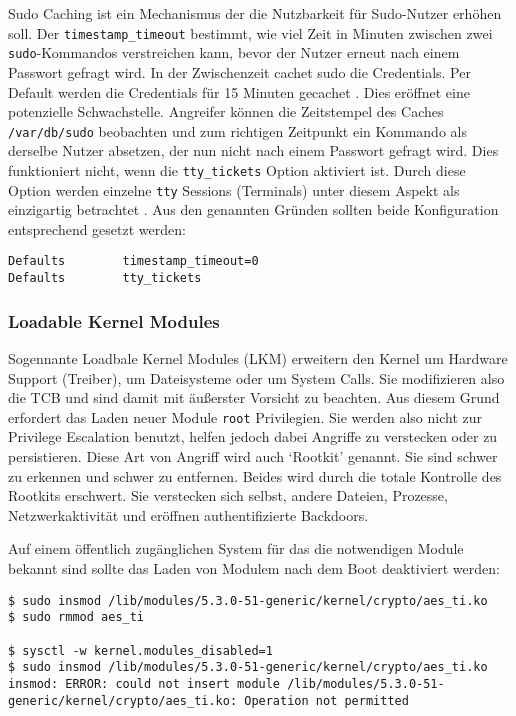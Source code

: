 Sudo Caching ist ein Mechanismus der die Nutzbarkeit für Sudo-Nutzer erhöhen soll. Der \texttt{timestamp\_timeout} bestimmt, wie viel Zeit in Minuten zwischen zwei \texttt{sudo}-Kommandos verstreichen kann, bevor der Nutzer erneut nach einem Passwort gefragt wird. In der Zwischenzeit cachet sudo die Credentials. Per Default werden die Credentials für 15 Minuten gecachet \cite{man-sudo}.
Dies eröffnet eine potenzielle Schwachstelle. Angreifer können die Zeitstempel des Caches \texttt{/var/db/sudo} beobachten und zum richtigen Zeitpunkt ein Kommando als derselbe Nutzer absetzen, der nun nicht nach einem Passwort gefragt wird. Dies funktioniert nicht, wenn die \texttt{tty\_tickets} Option aktiviert ist. Durch diese Option werden einzelne \texttt{tty} Sessions (Terminals) unter diesem Aspekt als einzigartig betrachtet \cite{attack-sudo-caching}.
Aus den genannten Gründen sollten beide Konfiguration entsprechend gesetzt werden:

\begin{lstlisting}
Defaults        timestamp_timeout=0
Defaults        tty_tickets 
\end{lstlisting}


\subsubsection{Loadable Kernel Modules}

Sogennante Loadbale Kernel Modules (LKM) erweitern den Kernel um Hardware Support (Treiber), um Dateisysteme oder um System Calls. Sie modifizieren also die TCB und sind damit mit äußerster Vorsicht zu beachten. Aus diesem Grund erfordert das Laden neuer Module \texttt{root} Privilegien. Sie werden also nicht zur Privilege Escalation benutzt, helfen jedoch dabei Angriffe zu verstecken oder zu persistieren. Diese Art von Angriff wird auch `Rootkit' genannt. Sie sind schwer zu erkennen
und schwer zu entfernen. Beides wird durch die totale Kontrolle des Rootkits erschwert. Sie verstecken sich selbst, andere Dateien, Prozesse, Netzwerkaktivität und eröffnen authentifizierte Backdoors. \cite{attack-rootkit, attack-lkm}

Auf einem öffentlich zugänglichen System für das die notwendigen Module bekannt sind sollte das Laden von Modulem nach dem Boot deaktiviert werden:

\begin{lstlisting}
$ sudo insmod /lib/modules/5.3.0-51-generic/kernel/crypto/aes_ti.ko
$ sudo rmmod aes_ti

$ sysctl -w kernel.modules_disabled=1
$ sudo insmod /lib/modules/5.3.0-51-generic/kernel/crypto/aes_ti.ko
insmod: ERROR: could not insert module /lib/modules/5.3.0-51-generic/kernel/crypto/aes_ti.ko: Operation not permitted
\end{lstlisting}

